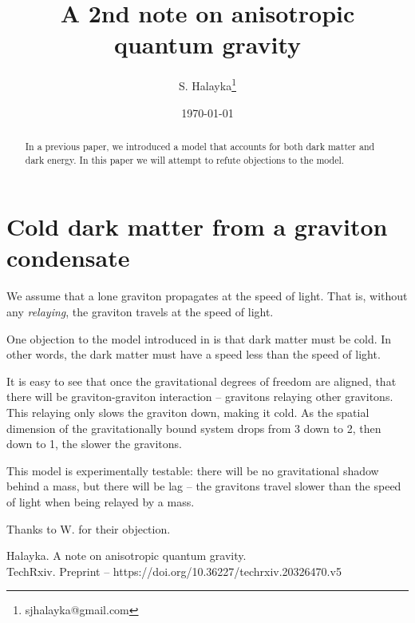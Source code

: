 \documentclass[12pt]{article}
\title{A 2nd note on anisotropic quantum gravity}
\author{S. Halayka\footnote{sjhalayka@gmail.com}}
\date{\today\;\currenttime}
\begin{document}
 
\maketitle

\begin{abstract}
In a previous paper, we introduced a model that accounts for both dark matter and dark energy. In this paper we will attempt to refute objections to the model.
\end{abstract}


\section{Cold dark matter from a graviton condensate}

We assume that a lone graviton propagates at the speed of light. That is, without any {\textit{relaying}}, the graviton travels at the speed of light.

One objection to the model introduced in \cite{halayka} is that dark matter must be cold. In other words, the dark matter must have a speed less than the speed of light.

It is easy to see that once the gravitational degrees of freedom are aligned, that there will be graviton-graviton interaction -- gravitons relaying other gravitons. This relaying only slows the graviton down, making it cold. As the spatial dimension of the gravitationally bound system drops from 3 down to 2, then down to 1, the slower the gravitons.

This model is experimentally testable: there will be no gravitational shadow behind a mass, but there will be lag -- the gravitons travel slower than the speed of light when being relayed by a mass.

Thanks to W. for their objection.




\begin{thebibliography}{9}

 Halayka. A note on anisotropic quantum gravity.\\TechRxiv. Preprint -- https://doi.org/10.36227/techrxiv.20326470.v5


\end{thebibliography}
\end{document}
